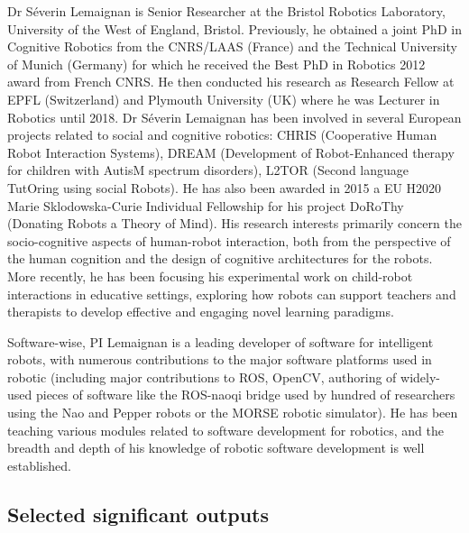 \documentclass[11pt]{report}
\begin{document}
Dr Séverin Lemaignan is Senior Researcher at the Bristol Robotics
Laboratory, University of the West of England, Bristol. Previously, he
obtained a joint PhD in Cognitive Robotics from the CNRS/LAAS (France)
and the Technical University of Munich (Germany) for which he received
the Best PhD in Robotics 2012 award from French CNRS. He then conducted
his research as Research Fellow at EPFL (Switzerland) and Plymouth
University (UK) where he was Lecturer in Robotics until 2018. Dr Séverin
Lemaignan has been involved in several European projects related to
social and cognitive robotics: CHRIS (Cooperative Human Robot
Interaction Systems), DREAM (Development of Robot-Enhanced therapy for
children with AutisM spectrum disorders), L2TOR (Second language
TutOring using social Robots). He has also been awarded in 2015 a EU
H2020 Marie Sklodowska-Curie Individual Fellowship for his project
DoRoThy (Donating Robots a Theory of Mind). His research interests
primarily concern the socio-cognitive aspects of human-robot
interaction, both from the perspective of the human cognition and the
design of cognitive architectures for the robots. More recently, he has
been focusing his experimental work on child-robot interactions in
educative settings, exploring how robots can support teachers and
therapists to develop effective and engaging novel learning paradigms.

Software-wise, PI Lemaignan is a leading
developer of software for intelligent robots, with numerous contributions to
the major software platforms used in robotic (including major contributions to
ROS, OpenCV, authoring of widely-used pieces of software like the ROS-naoqi
bridge used by hundred of researchers using the Nao and Pepper robots or the
MORSE robotic simulator). He has been teaching various modules related to
software development for robotics, and the breadth and depth of his knowledge of
robotic software development is well established. 

\newpage
\subsection{Selected significant outputs}
\end{document}
